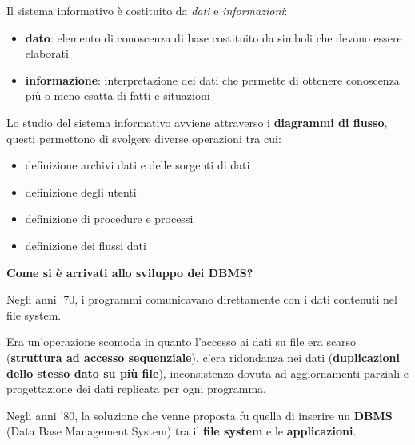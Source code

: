 \documentclass[a4paper, 12pt]{book}
\begin{document}
    \vspace{15pt}



    Il sistema informativo è costituito da \textit{dati} e \textit{informazioni}:
    \begin{itemize}
      \item \textbf{dato}: elemento di conoscenza di base costituito da simboli che devono essere elaborati
      \item \textbf{informazione}: interpretazione dei dati che permette di ottenere conoscenza più o meno esatta di fatti e situazioni
    \end{itemize}
    
    Lo studio del sistema informativo avviene attraverso i \textbf{diagrammi di flusso}, questi permettono di svolgere diverse operazioni tra cui: 
    \begin{itemize}
      \item definizione archivi dati e delle sorgenti di dati
      \item definizione degli utenti
      \item definizione di procedure e processi
      \item definizione dei flussi dati
    \end{itemize}


    \clearpage
    \textbf{\large Come si è arrivati allo sviluppo dei DBMS?}
 
    Negli anni '70, i programmi comunicavano direttamente con i dati contenuti nel file system. 
    
    Era un'operazione scomoda in quanto l’accesso ai dati su file era scarso (\textbf{struttura ad accesso sequenziale}), c'era ridondanza nei dati (\textbf{duplicazioni dello stesso dato su più file}), inconsistenza dovuta ad aggiornamenti parziali e progettazione dei dati replicata per ogni programma.

    Negli anni '80, la soluzione che venne proposta fu quella di inserire un \textbf{DBMS} (Data Base Management System) tra il \textbf{file system} e le \textbf{applicazioni}.
\end{document}
